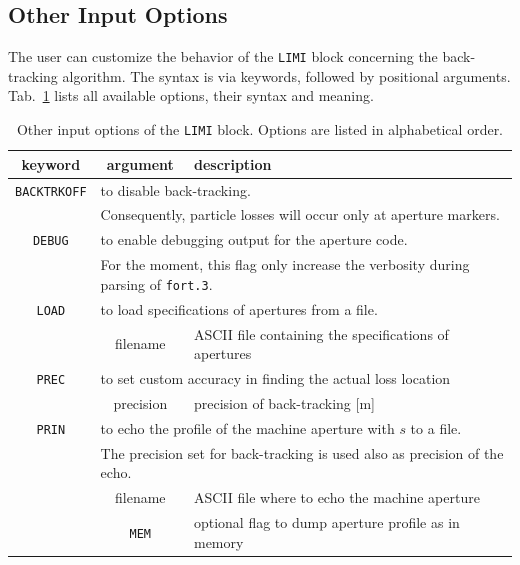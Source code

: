 \bigskip
\subsection{Other Input Options}\label{ApeLim:inpOptions}
The user can customize the behavior of the \texttt{LIMI} block concerning the back-tracking algorithm. The syntax is via keywords, followed by positional arguments.
Tab.~\ref{tab:apeInpOptions} lists all available options, their syntax and meaning.

\begin{center}
\begin{longtable}{|c|c|l|}%
    \caption{Other input options of the \texttt{LIMI} block. Options are listed in alphabetical order.}
    \label{tab:apeInpOptions} \\*
    \hline
    \rowcolor{blue!30}
    keyword & argument & description \\*
    \hline
    \endfirsthead

    \texttt{BACKTRKOFF} & \multicolumn{2}{l|}{to disable back-tracking.} \\*
                        & \multicolumn{2}{l|}{Consequently, particle losses will occur only at aperture markers.} \\*
    \hline

    \texttt{DEBUG} & \multicolumn{2}{l|}{to enable debugging output for the aperture code.} \\*
                   & \multicolumn{2}{l|}{For the moment, this flag only increase the verbosity during parsing of \texttt{fort.3}.} \\*
    \hline

    \texttt{LOAD}  & \multicolumn{2}{l|}{to load specifications of apertures from a file.} \\*
    \cline{2-3}
                   & filename & ASCII file containing the specifications of apertures \\*
    \hline

    \texttt{PREC}  & \multicolumn{2}{l|}{to set custom accuracy in finding the actual loss location} \\*
    \cline{2-3}
                   & precision & precision of back-tracking [m] \\*
    \hline

    \texttt{PRIN}  & \multicolumn{2}{l|}{to echo the profile of the machine aperture with $s$ to a file.} \\*
                   & \multicolumn{2}{l|}{The precision set for back-tracking is used also as precision of the echo.} \\*
    \cline{2-3}
                   & filename & ASCII file where to echo the machine aperture \\*
                   & \texttt{MEM} & optional flag to dump aperture profile as in memory \\*
    \hline


\end{longtable}
\end{center}
